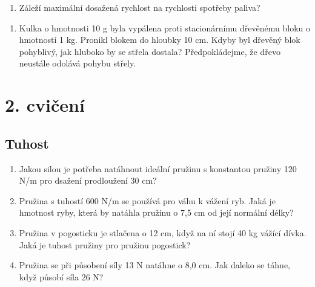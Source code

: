 \documentclass[letterpaper,10pt,english]{jupyterBook}
\begin{document}
{{\begin{enumerate}
\begin{enumerate}
\item {} 
\sphinxAtStartPar
Záleží maximální dosažená rychlost na rychlosti spotřeby paliva?

\end{enumerate}

\end{enumerate}

\sphinxAtStartPar
{}
\begin{enumerate}
%
\setcounter{enumi}{1}
\item {} 
\sphinxAtStartPar
Kulka o hmotnosti 10 g byla vypálena proti stacionárnímu dřevěnému bloku o hmotnosti 1 kg. Pronikl blokem do hloubky 10 cm. Kdyby byl dřevěný blok pohyblivý, jak hluboko by se střela dostala? Předpokládejme, že dřevo neustále odolává pohybu střely.

\end{enumerate}

\sphinxAtStartPar
{}

\sphinxstepscope


\chapter{2. cvičení}
\label{\detokenize{Cviceni/C2:cviceni}}\label{\detokenize{Cviceni/C2::doc}}

\section{Tuhost}
\label{\detokenize{Cviceni/C2:tuhost}}\begin{enumerate}
%
\item {} 
\sphinxAtStartPar
Jakou silou je potřeba natáhnout ideální pružinu s konstantou pružiny 120 N/m pro dsažení prodloužení
30 cm?

\item {} 
\sphinxAtStartPar
Pružina s tuhostí 600 N/m se používá pro váhu k vážení ryb. Jaká je
hmotnost ryby, která by natáhla pružinu o 7,5 cm od její normální délky?

\item {} 
\sphinxAtStartPar
Pružina v pogo\sphinxhyphen{}sticku je stlačena o 12 cm, když na ní stojí 40 kg vážící dívka. Jaká je
tuhost pružiny pro pružinu pogo\sphinxhyphen{}stick?

\item {} 
\sphinxAtStartPar
Pružina se při působení síly 13 N natáhne o 8,0 cm. Jak daleko se táhne, když působí síla 26 N?


\end{enumerate}}}
\end{document}
